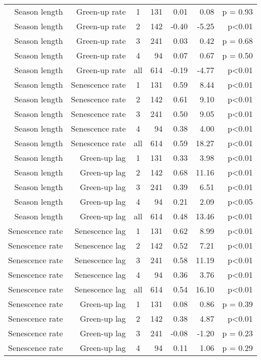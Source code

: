 \begin{table}[H]
\begin{tabular}{rrcrrrr}
   \hline
Season length & Green-up rate & 1 & 131 & 0.01 & 0.08 & p = 0.93 \\ 
  Season length & Green-up rate & 2 & 142 & -0.40 & -5.25 & p<0.01 \\ 
  Season length & Green-up rate & 3 & 241 & 0.03 & 0.42 & p = 0.68 \\ 
  Season length & Green-up rate & 4 &  94 & 0.07 & 0.67 & p = 0.50 \\ 
  Season length & Green-up rate & all & 614 & -0.19 & -4.77 & p<0.01 \\ 
   \hline
Season length & Senescence rate & 1 & 131 & 0.59 & 8.44 & p<0.01 \\ 
  Season length & Senescence rate & 2 & 142 & 0.61 & 9.10 & p<0.01 \\ 
  Season length & Senescence rate & 3 & 241 & 0.50 & 9.05 & p<0.01 \\ 
  Season length & Senescence rate & 4 &  94 & 0.38 & 4.00 & p<0.01 \\ 
  Season length & Senescence rate & all & 614 & 0.59 & 18.27 & p<0.01 \\ 
   \hline
Season length & Green-up lag & 1 & 131 & 0.33 & 3.98 & p<0.01 \\ 
  Season length & Green-up lag & 2 & 142 & 0.68 & 11.16 & p<0.01 \\ 
  Season length & Green-up lag & 3 & 241 & 0.39 & 6.51 & p<0.01 \\ 
  Season length & Green-up lag & 4 &  94 & 0.21 & 2.09 & p<0.05 \\ 
  Season length & Green-up lag & all & 614 & 0.48 & 13.46 & p<0.01 \\ 
   \hline
Senescence rate & Senescence lag & 1 & 131 & 0.62 & 8.99 & p<0.01 \\ 
  Senescence rate & Senescence lag & 2 & 142 & 0.52 & 7.21 & p<0.01 \\ 
  Senescence rate & Senescence lag & 3 & 241 & 0.58 & 11.19 & p<0.01 \\ 
  Senescence rate & Senescence lag & 4 &  94 & 0.36 & 3.76 & p<0.01 \\ 
  Senescence rate & Senescence lag & all & 614 & 0.54 & 16.10 & p<0.01 \\ 
   \hline
Senescence rate & Green-up lag & 1 & 131 & 0.08 & 0.86 & p = 0.39 \\ 
  Senescence rate & Green-up lag & 2 & 142 & 0.38 & 4.87 & p<0.01 \\ 
  Senescence rate & Green-up lag & 3 & 241 & -0.08 & -1.20 & p = 0.23 \\ 
  Senescence rate & Green-up lag & 4 &  94 & 0.11 & 1.06 & p = 0.29 \\ 

\end{tabular}
\end{table}
